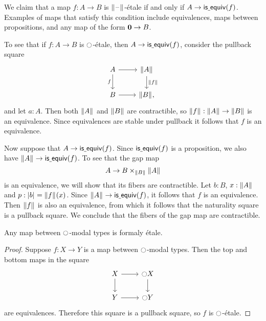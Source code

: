 \documentclass[9pt,twosided]{amsart}
\begin{document}
\begin{eg}\label{eg:etale_prop}
We claim that a map $f:A\to B$ is $\brck{\blank}$-\'etale if and only if $A\to \mathsf{is\underline{\ }{}equiv}(f)$. Examples of maps that satisfy this condition include equivalences, maps between propositions, and any map of the form $\mathbf{0}\to B$.

To see that if $f:A\to B$ is ${\ocircle}$-\'etale, then $A\to\mathsf{is\underline{\ }{}equiv}(f)$, consider the pullback square
\begin{equation*}
\begin{tikzcd}
A \arrow[r] \arrow[d,swap,"f"] & \brck{A} \arrow[d,"\brck{f}"] \\
B \arrow[r] & \brck{B},
\end{tikzcd}
\end{equation*}
and let $a:A$. Then both $\brck{A}$ and $\brck{B}$ are contractible, so $\brck{f}:\brck{A}\to\brck{B}$ is an equivalence. Since equivalences are stable under pullback it follows that $f$ is an equivalence.

Now suppose that $A\to \mathsf{is\underline{\ }{}equiv}(f)$. Since $\mathsf{is\underline{\ }{}equiv}(f)$ is a proposition, we also have $\brck{A}\to\isequiv(f)$. To see that the gap map
\begin{equation*}
A \to B\times_{\brck{B}}\brck{A}
\end{equation*}
is an equivalence, we will show that its fibers are contractible. Let $b:B$, $x:\brck{A}$ and $p:\bproj{b}=\brck{f}(x)$. Since $\brck{A}\to\isequiv(f)$, it follows that $f$ is an equivalence. Then $\brck{f}$ is also an equivalence, from which it follows that the naturality square is a pullback square. We conclude that the fibers of the gap map are contractible. 
\end{eg}

\begin{lem}\label{lem:etale_modal}
Any map between ${\ocircle}$-modal types is formaly \'etale.
\end{lem}

\begin{proof}
Suppose $f:X\to Y$ is a map between ${\ocircle}$-modal types. Then the top and bottom maps in the square
\begin{equation*}
\begin{tikzcd}
X \arrow[r] \arrow[d] & \modal X \arrow[d] \\
Y \arrow[r] & \modal Y
\end{tikzcd}
\end{equation*}
are equivalences. Therefore this square is a pullback square, so $f$ is ${\ocircle}$-\'etale.
\end{proof}
\end{document}
